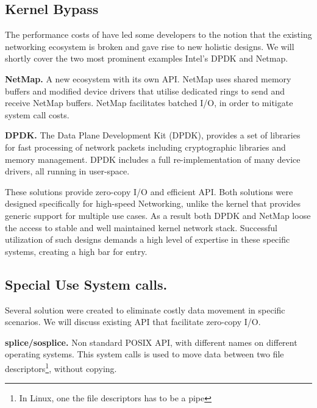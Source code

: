 \subsection{Kernel Bypass}
The performance costs of \sockets have led some developers to the notion that the existing networking ecosystem is broken and gave rise to new holistic designs. We will shortly cover the two most prominent examples Intel's DPDK\cite{dpdk} and Netmap\cite{rizzo2012netmap}.


\noindent\textbf{NetMap.} A new ecosystem with its own API. NetMap\cite{rizzo2012netmap} uses shared memory buffers and modified device drivers that utilise dedicated rings to send and receive NetMap buffers. NetMap facilitates batched I/O, in order to mitigate system call costs.

\noindent \textbf{DPDK.}
The Data Plane Development Kit (DPDK)\cite{dpdk}, provides a  set of libraries for fast processing of network packets including cryptographic libraries and memory management. DPDK includes a full re-implementation of many device drivers, all running in user-space.

\noindent These solutions provide zero-copy I/O and efficient API. Both solutions were designed specifically for high-speed Networking, unlike the kernel that provides generic support for multiple use cases. As a result both DPDK and NetMap loose the access to stable and well maintained kernel network stack. Successful utilization of such designs demands a high level of expertise in these specific systems, creating a high bar for entry.

\subsection{Special Use System calls.}
Several solution were created to eliminate costly data movement in specific scenarios. We will discuss existing API that facilitate zero-copy I/O.

\noindent\textbf{splice/sosplice\cite{splice,sosplice}.}
Non standard POSIX API, with different names on different operating systems. This system calls is used to move data between two file descriptors\footnote{In Linux, one the file descriptors has to be a pipe}, without copying. 

